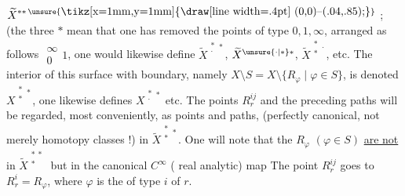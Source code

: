 
$\widetilde{X}^{\substack{*\\*}*\,\unsure{\vcenter{\hbox{\tikz[x=1mm,y=1mm]{\draw[line width=.4pt] (0,0)--(.04,.85);}}}}}$ ; (the three $*$ mean that one has removed  the points of type $0,1,\infty$, arranged as follows $\substack{\infty\\0}1$, one would likewise define $\widetilde{X}^{\substack{*\\\cdot}*}$, $\widetilde{X}^{\substack{\unsure{\cdot|*}\\*}*}$, $\widetilde{X}^{\substack{*\\*}\cdot}$, etc.  The interior of this surface with boundary, namely $X\setminus S=X\setminus\{R_\varphi\mid\varphi\in S\}$, is denoted $X^{\substack{*\\*}*}$, one likewise defines $X^{\substack{*\\\cdot}*}$ etc. The points $R_r^{ij}$ and the preceding paths will be regarded, most conveniently, as points and paths, (perfectly canonical, not merely homotopy classes !) in $\widetilde{X}^{\substack{*\\*}*}$. One will note that the $R_\varphi$ $(\varphi\in S)$ \uline{are not} in $\widetilde{X}^{\substack{*\ *\\*}}$
but in the canonical $C^\infty$ ( real analytic) map
The point $R_r^{ij}$ goes to $R_r^i=R_\varphi$, where $\varphi$ is the   of type $i$ of $r$.

